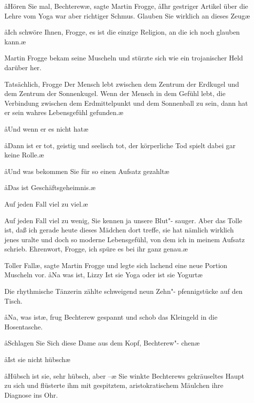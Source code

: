\aa{}Hören Sie mal, Bechterew\ae{}, sagte Martin Frogge, \aa{}Ihr
gestriger Artikel über die Lehre vom Yoga war aber richtiger
Schmus. Glauben Sie wirklich an dieses Zeug\frag{}\ae{}

\aa{}Ich schwöre Ihnen, Frogge, es ist die einzige Religion, an
die ich noch glauben kann.\ae{}

Martin Frogge bekam seine Muscheln und stürzte sich wie ein
trojanischer Held darüber her.

\aanah{}Tatsächlich, Frogge\ausr{} Der Mensch lebt zwischen dem Zentrum
der Erdkugel und dem Zentrum der Sonnenkugel. Wenn der
Mensch in dem Gefühl lebt, die Verbindung zwischen dem
Erdmittelpunkt und dem Sonnenball zu sein, dann hat er
sein wahres Lebensgefühl gefunden.\ae{}

\aa{}Und wenn er es nicht hat\frag{}\ae{}

\aa{}Dann ist er tot, geistig und seelisch tot, der körperliche Tod
spielt dabei gar keine Rolle.\ae{}

\aa{}Und was bekommen Sie für so einen Aufsatz gezahlt\frag{}\ae{}

\aa{}Das ist Geschäftsgeheimnis.\ae{}

\aanah{}Auf jeden Fall viel zu viel.\ae{}

\aanah{}Auf jeden Fall viel zu wenig, Sie kennen ja unsere Blut"-%
sauger. Aber das Tolle ist, daß ich gerade heute dieses
Mädchen dort treffe, sie hat nämlich wirklich jenes uralte und
doch so moderne Lebensgefühl, von dem ich in meinem
Aufsatz schrieb. Ehrenwort, Frogge, ich spüre es bei ihr ganz
genau.\ae{}

\aanah{}Toller Fall\ae{}, sagte Martin Frogge und legte sich lachend eine
neue Portion Muscheln vor. \aa{}Na was ist, Lizzy\frag{} Ist sie Yoga
oder ist sie Yogurt\frag{}\ae{}

Die rhythmische Tänzerin zählte schweigend neun Zehn"-%
pfennigstücke auf den Tisch.

\aa{}Na, was ist\frag{}\ae{},\eingriff{eS52-1}{ist\frag{}\ae{}, ] ist\frag{}\ae{}} frug Bechterew gespannt und schob das
Kleingeld in die Hosentasche.

\aa{}Schlagen Sie Sich%
\eingriff{eS52-2}{Sich ] sich}
diese Dame aus dem Kopf, Bechterew"-%
chen\ausr{}\ae{}

\aa{}Ist sie nicht hübsch\frag{}\ae{}

\aa{}Hübsch ist sie, sehr hübsch, aber --\ae{} Sie winkte Bechterews
gekräuseltes Haupt zu sich und flüsterte ihm mit gespitztem,
aristokratischem Mäulchen ihre Diagnose ins Ohr.

